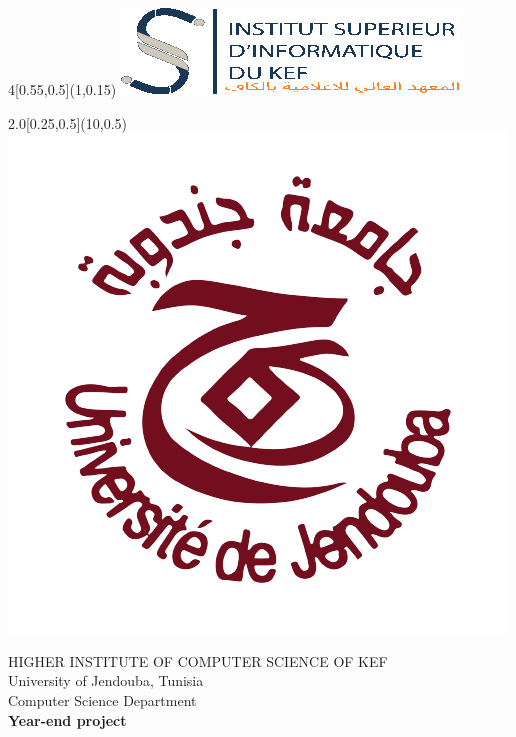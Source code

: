 \begin{titlepage}
\BgThispage
\begin{textblock}{4}[0.55,0.5](1,0.15)
	\includegraphics[width=\linewidth]{images/isik.png}\\[2cm]
  \end{textblock}
  
\begin{textblock}{2.0}[0.25,0.5](10,0.5)
	\includegraphics[width=\linewidth]{images/uj.png}\\[3.5cm]
  \end{textblock}
  
  
\bigskip
\bigskip
\begin{center}
{ \large{HIGHER INSTITUTE OF COMPUTER SCIENCE OF KEF }}\\[0.5cm]
{ \large{University of Jendouba, Tunisia}}\\[0.8cm]
{\large{Computer Science Department}}\\[0.5cm]
{\large \textbf{Year-end project}}\\[0.3cm]


\end{center}
\end{titlepage}
